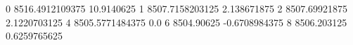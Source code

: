 0 8516.4912109375 10.9140625
1 8507.7158203125 2.138671875
2 8507.69921875 2.1220703125
4 8505.5771484375 0.0
6 8504.90625 -0.6708984375
8 8506.203125 0.6259765625
